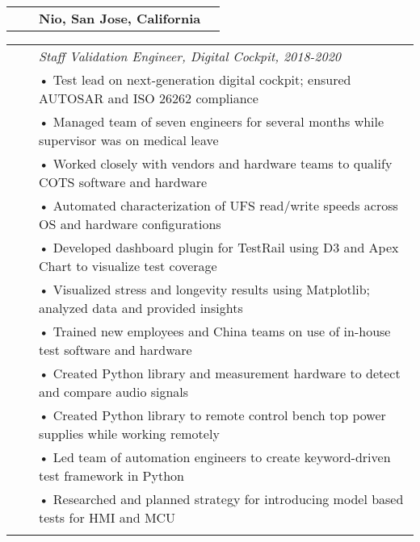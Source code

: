 \documentclass{minimal}
\begin{document}
\begin{CJK*}{UTF8}{}
\begin{tabular}{ p{1.5cm} p{1cm} p{16cm} >{\raggedleft\arraybackslash}p{3cm} }
& & \textbf{Nio, San Jose, California} & \\
\end{tabular}

\begin{tabular}{ p{1.5cm} p{1cm} p{16cm} }
& & \textit{Staff Validation Engineer, Digital Cockpit, 2018-2020}\\
& & • Test lead on next-generation digital cockpit; ensured AUTOSAR and ISO 26262 compliance\\
& & • Managed team of seven engineers for several months while supervisor was on medical leave\\
& & • Worked closely with vendors and hardware teams to qualify COTS software and hardware\\
& & • Automated characterization of UFS read/write speeds across OS and hardware configurations\\
& & • Developed dashboard plugin for TestRail using D3 and Apex Chart to visualize test coverage\\
& & • Visualized stress and longevity results using Matplotlib; analyzed data and provided insights\\
& & • Trained new employees and China teams on use of in-house test software and hardware\\
& & • Created Python library and measurement hardware to detect and compare audio signals\\
& & • Created Python library to remote control bench top power supplies while working remotely\\
& & • Led team of automation engineers to create keyword-driven test framework in Python\\
& & • Researched and planned strategy for introducing model based tests for HMI and MCU\\
& & \\
\end{tabular}


\end{CJK*}
\end{document}
